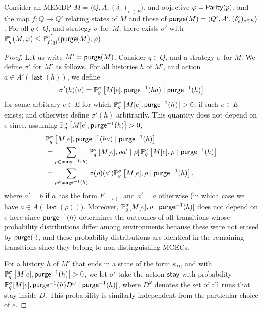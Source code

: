 \documentclass[a4paper,USenglish,cleveref, autoref, thm-restate]{lipics-v2021}
\newcommand{\tuple}[1]{\langle #1 \rangle}
\newcommand*{\pr}{\mathbb{P}}
\newcommand\Parity{\textrm{\sf Parity}}
\newcommand{\last}{\operatorname{\mathsf{last}}}
\newcommand\purge[1]{\textrm{\sf purge}(#1)}
\newcommand\purgeinv[1]{\textrm{\sf purge}^{-1}(#1)}
\def\actionstay{\textrm{\sf stay}}
\begin{document}
\begin{lemma}
  \label{lemma:removing-nondist-cecs-stratmap}
  Consider an MEMDP $M=\tuple{Q,A,(\delta_e)_{e\in E}}$, and objective $\varphi=\Parity(p)$,
  and the map $f:Q\rightarrow Q'$ relating states of $M$ and those of $\purge{M} = \tuple{Q',A',(\delta_e')_{e\in E}}$.
  For all $q \in Q$, and strategy $\sigma$ for~$M$, there exists $\sigma'$ with
  $\pr_{q}^\sigma(M,\varphi) \leq \pr_{f(q)}^{\sigma'}(\purge{M},\varphi)$.
\end{lemma}
\begin{proof}
  Let us write $M'=\purge{M}$.
  Consider $q \in Q$, and a strategy $\sigma$ for $M$.
  We define $\sigma'$ for $M'$ as follows. For all histories $h$ of $M'$, and action $a \in A'(\last(h))$, we define
  \[
    \sigma'(h)(a) = \pr^\sigma_q\left[M[e], \purgeinv{ha} \mid \purgeinv{h}\right]
  \]
  for some arbitrary $e \in E$ for which $\pr^\sigma_q\left[M[e], \purgeinv{h}\right]>0$,
  if such $e \in E$ exists; and otherwise define $\sigma'(h)$ arbitrarily.
  This quantity does not depend on $e$ since, assuming $\pr^\sigma_q\left[M[e], \purgeinv{h}\right]>0$,
  \begin{align*}
    &   \pr^\sigma_q\left[M[e], \purgeinv{ha}\mid \purgeinv{h}\right]\\
    & = \sum_{\rho \in \purgeinv{h}} \pr^\sigma_q\left[M[e], \rho a' \mid \rho\right] \pr^\sigma_q\left[M[e], \rho \mid \purgeinv{h}\right] \\
    & = \sum_{\rho \in \purgeinv{h}} \sigma(\rho)(a') \pr^\sigma_q\left[M[e], \rho \mid \purgeinv{h}\right],
  \end{align*}
  where $a' = b$ if $a$ has the form $F_{(\_,b)}$,
  and $a'=a$ otherwise (in which case we have $a \in A(\last(\rho))$).
  Moreover, $\pr_q^\sigma[M[e], \rho \mid \purgeinv{h}]$ does not depend on $e$ here since 
  $\purgeinv{h}$ determines the outcomes of all transitions whose probability distributions differ among environments
  because these were not erased by $\purge{\cdot}$,
  and these probability distributions are identical in the remaining transitions since they belong to non-distinguishing MCECs.

  For a history $h$ of $M'$ that ends in a state of the form $s_D$, 
  and with $\pr^\sigma_q\left[M[e], \purgeinv{h}\right]>0$,
  we let $\sigma'$ take the action $\actionstay$
  with probability $\pr_q^\sigma[M[e], \purgeinv{h} D^\omega \mid \purgeinv{h}]$,
  where $D^\omega$ denotes the set of all runs that stay inside $D$.
  This probability is similarly independent from the particular choice of $e$.


\end{proof}
\end{document}
